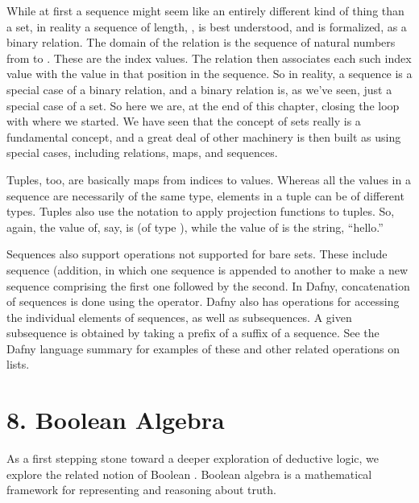 \documentclass[letterpaper,10pt,english]{sphinxmanual}
\begin{document}
While at first a sequence might seem like an entirely different kind
of thing than a set, in reality a sequence of length, , is best
understood, and is formalized, as a binary relation. The domain of the
relation is the sequence of natural numbers from  to .  These
are the index values. The relation then associates each such index
value with the value in that position in the sequence. So in reality,
a sequence is a special case of a binary relation, and a binary
relation is, as we’ve seen, just a special case of a set.  So here we
are, at the end of this chapter, closing the loop with where we
started. We have seen that the concept of sets really is a fundamental
concept, and a great deal of other machinery is then built as using
special cases, including relations, maps, and sequences.

Tuples, too, are basically maps from indices to values. Whereas all
the values in a sequence are necessarily of the same type, elements in
a tuple can be of different types. Tuples also use the  notation
to apply projection functions to tuples. So, again, the value of, say,
 is  (of type ), while the value of
 is the string, “hello.”

Sequences also support operations not supported for bare sets. These
include sequence  (addition, in which one sequence is
appended to another to make a new sequence comprising the first one
followed by the second. In Dafny, concatenation of sequences is done
using the \sphinxstyleemphasis{+} operator. Dafny also has operations for accessing the
individual elements of sequences, as well as subsequences. A given
subsequence is obtained by taking a prefix of a suffix of a sequence.
See the Dafny language summary for examples of these and other related
operations on lists.


\chapter{8. Boolean Algebra}
\label{\detokenize{08-boolean-algebra:boolean-algebra}}\label{\detokenize{08-boolean-algebra::doc}}
As a first stepping stone toward a deeper exploration of deductive
logic, we explore the related notion of Boolean . Boolean
algebra is a mathematical framework for representing and reasoning
about truth.
\end{document}
